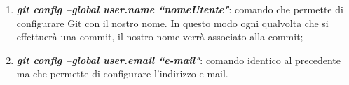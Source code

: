 \begin{itemize}
                            \begin{enumerate}
                                \item \textbf{\textit{git config --global user.name ``nomeUtente"}}: comando che
                                permette di configurare Git con il nostro nome. In questo modo ogni qualvolta che
                                si effettuerà una commit, il nostro nome verrà associato alla commit;
                                \item \textbf{\textit{git config --global user.email ``e-mail"}}: comando identico
                                al precedente ma che permette di configurare l'indirizzo e-mail.
                            \end{enumerate}

                    \end{itemize}